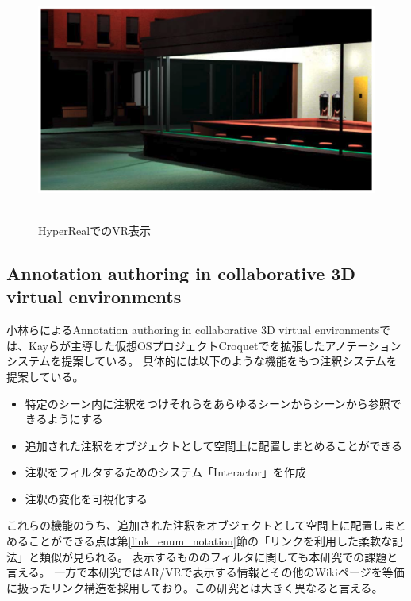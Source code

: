 \begin{figure}[h]
  \centering 
  \includegraphics[height=80mm]{images/HyperReal_vr.png}
  \caption{HyperRealでのVR表示} \label{fig:HyperReal_vr}
\end{figure}


\subsection{Annotation authoring in collaborative 3D virtual environments}
小林らによるAnnotation authoring in collaborative 3D virtual environments\cite{10.1145/1152399.1152452}では、Kayらが主導した仮想OSプロジェクトCroquet\cite{10.5555/1009376.1009395}でを拡張したアノテーションシステムを提案している。
具体的には以下のような機能をもつ注釈システムを提案している。
\begin{itemize} 
  \item 特定のシーン内に注釈をつけそれらをあらゆるシーンからシーンから参照できるようにする
  \item 追加された注釈をオブジェクトとして空間上に配置しまとめることができる
  \item 注釈をフィルタするためのシステム「Interactor」を作成
  \item 注釈の変化を可視化する
\end{itemize}
これらの機能のうち、追加された注釈をオブジェクトとして空間上に配置しまとめることができる点は第\ref{link_enum_notation}節の「リンクを利用した柔軟な記法」と類似が見られる。
表示するもののフィルタに関しても本研究での課題と言える。
一方で本研究ではAR/VRで表示する情報とその他のWikiページを等価に扱ったリンク構造を採用しており。この研究とは大きく異なると言える。

